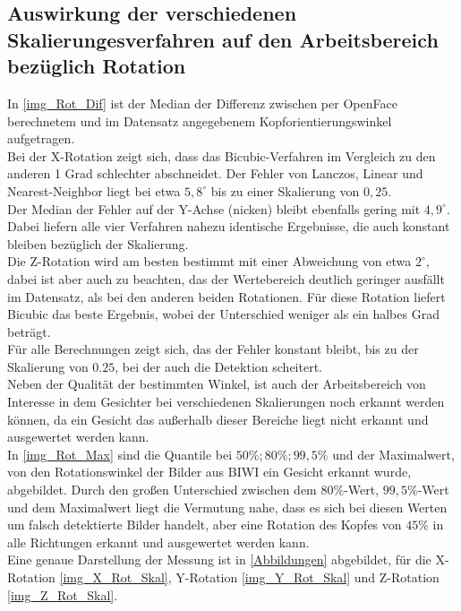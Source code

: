 \subsection{Auswirkung der verschiedenen Skalierungesverfahren auf den Arbeitsbereich bezüglich Rotation}
In \autoref{img_Rot_Dif} ist der Median der Differenz zwischen per OpenFace berechnetem und im Datensatz angegebenem Kopforientierungswinkel aufgetragen.\\
Bei der X-Rotation zeigt sich, dass das Bicubic-Verfahren im Vergleich zu den anderen 1 Grad schlechter abschneidet. Der Fehler von Lanczos, Linear und Nearest-Neighbor liegt bei etwa $5,8^\circ$ bis zu einer Skalierung von $0,25$.\\
Der Median der Fehler auf der Y-Achse (nicken) bleibt ebenfalls gering mit $4,9^\circ$. Dabei liefern alle vier Verfahren nahezu identische Ergebnisse, die auch konstant bleiben bezüglich der Skalierung.\\
Die Z-Rotation wird am besten bestimmt mit einer Abweichung von etwa $2^\circ$, dabei ist aber auch zu beachten, das der Wertebereich deutlich geringer ausfällt im Datensatz, als bei den anderen beiden Rotationen. Für diese Rotation liefert Bicubic das beste Ergebnis, wobei der Unterschied weniger als ein halbes Grad beträgt.\\
Für alle Berechnungen zeigt sich, das der Fehler konstant bleibt, bis zu der Skalierung von $0.25$, bei der auch die Detektion scheitert.\\
Neben der Qualität der bestimmten Winkel, ist auch der Arbeitsbereich von Interesse in dem Gesichter bei verschiedenen Skalierungen noch erkannt werden können, da ein Gesicht das außerhalb dieser Bereiche liegt nicht erkannt und ausgewertet werden kann.\\
In \autoref{img_Rot_Max} sind die Quantile bei $50\%; 80\%; 99,5\%$ und der Maximalwert, von den Rotationswinkel der Bilder aus BIWI \cite{database_Face_Ori} ein Gesicht erkannt wurde, abgebildet. Durch den großen Unterschied zwischen dem $80\%$-Wert, $99,5\%$-Wert und dem Maximalwert liegt die Vermutung nahe, dass es sich bei diesen Werten um falsch detektierte Bilder handelt, aber eine Rotation des Kopfes von $45\%$ in alle Richtungen erkannt und ausgewertet werden kann.\\
Eine genaue Darstellung der Messung ist in \autoref{Abbildungen} abgebildet, für die X-Rotation \autoref{img_X_Rot_Skal}, Y-Rotation \autoref{img_Y_Rot_Skal} und Z-Rotation \autoref{img_Z_Rot_Skal}.
